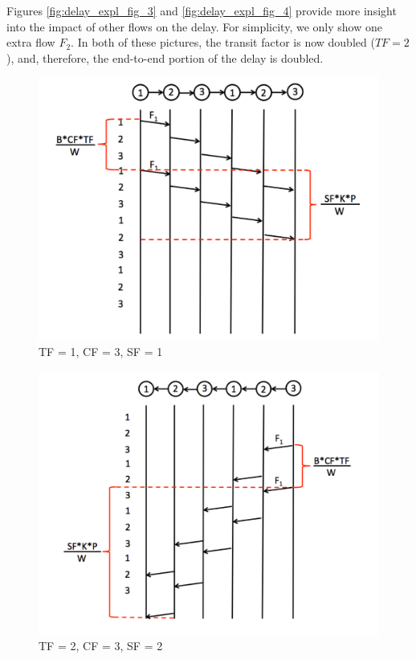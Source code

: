 \documentclass[conference]{IEEEtran}
\begin{document}
Figures \ref{fig:delay_expl_fig_3} and \ref{fig:delay_expl_fig_4} provide more insight into the impact of other flows on the delay.  For simplicity, we only show one extra flow $F_2$.  In both of these pictures, the transit factor is now doubled ($TF = 2$), and, therefore, the end-to-end portion of the delay is doubled.  



\begin{figure}
    \includegraphics[scale=0.35]{figures/delay_limit_expl/delay_expl_fig_1.pdf}
    \caption{TF = 1, CF = 3, SF = 1}
    \label{fig:delay_expl_fig_1}
\end{figure}

  
\begin{figure}
    \includegraphics[scale=0.35]{figures/delay_limit_expl/delay_expl_fig_2.pdf}
    \caption{TF = 2, CF = 3, SF = 2}
    \label{fig:delay_expl_fig_2}
\end{figure}
  
\end{document}
